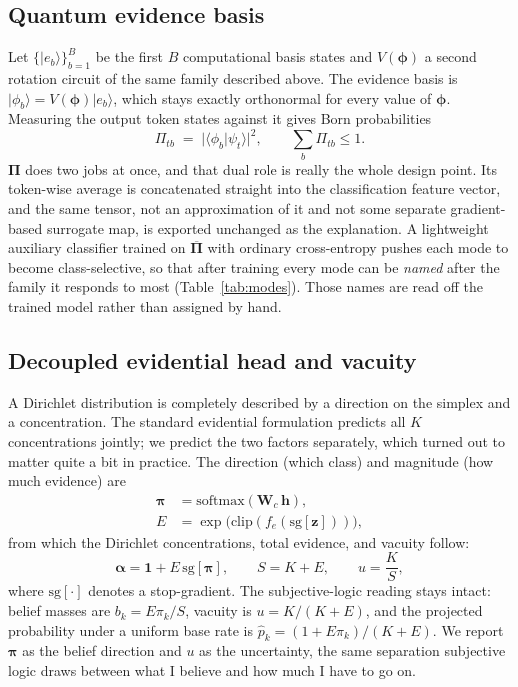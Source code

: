 \documentclass[conference]{IEEEtran}
\newcommand{\bs}[1]{\boldsymbol{#1}}
\newcommand{\ket}[1]{\lvert #1 \rangle}
\newcommand{\braket}[2]{\langle #1 \vert #2 \rangle}
\begin{document}
\subsection{Quantum evidence basis}
Let $\{\ket{e_{b}}\}_{b=1}^{B}$ be the first $B$ computational basis states and
$V(\bs{\phi})$ a second rotation circuit of the same family described above. The
evidence basis is $\ket{\phi_{b}} = V(\bs{\phi})\ket{e_{b}}$, which stays exactly
orthonormal for every value of $\bs{\phi}$. Measuring the output token states
against it gives Born probabilities
\begin{equation}
\Pi_{tb} \;=\; \bigl\lvert \braket{\phi_{b}}{\psi_{t}} \bigr\rvert^{2},
\qquad \textstyle\sum_{b}\Pi_{tb}\le 1 .
\label{eq:basis}
\end{equation}
$\bs{\Pi}$ does two jobs at once, and that dual role is really the whole design
point. Its token-wise average is concatenated straight into the classification
feature vector, and the same tensor, not an approximation of it and not some
separate gradient-based surrogate map, is exported unchanged as the explanation. A
lightweight auxiliary classifier trained on $\overline{\bs{\Pi}}$ with ordinary
cross-entropy pushes each mode to become class-selective, so that after training
every mode can be \emph{named} after the family it responds to most
(Table~\ref{tab:modes}). Those names are read off the trained model rather than
assigned by hand.

\subsection{Decoupled evidential head and vacuity}
A Dirichlet distribution is completely described by a direction on the simplex and
a concentration. The standard evidential formulation \cite{sensoy2018edl} predicts
all $K$ concentrations jointly; we predict the two factors separately, which turned
out to matter quite a bit in practice. The direction (which class) and magnitude
(how much evidence) are
\begin{align}
\bs{\pi} &= \mathrm{softmax}(\bs{W}_{c}\,\bs{h}), \label{eq:dir}\\
E &= \exp\bigl(\mathrm{clip}(f_{e}(\mathrm{sg}[\bs{z}]))\bigr), \label{eq:mag}
\end{align}
from which the Dirichlet concentrations, total evidence, and vacuity follow:
\begin{equation}
\bs{\alpha} = \bs{1} + E\,\mathrm{sg}[\bs{\pi}], \qquad S = K + E, \qquad
u = \frac{K}{S},
\label{eq:vacuity}
\end{equation}
where $\mathrm{sg}[\cdot]$ denotes a stop-gradient. The subjective-logic reading
stays intact: belief masses are $b_{k}=E\pi_{k}/S$, vacuity is $u=K/(K+E)$, and the
projected probability under a uniform base rate is
$\hat{p}_{k}=(1+E\pi_{k})/(K+E)$. We report $\bs{\pi}$ as the belief direction and
$u$ as the uncertainty, the same separation subjective logic draws between what I
believe and how much I have to go on.
\end{document}
